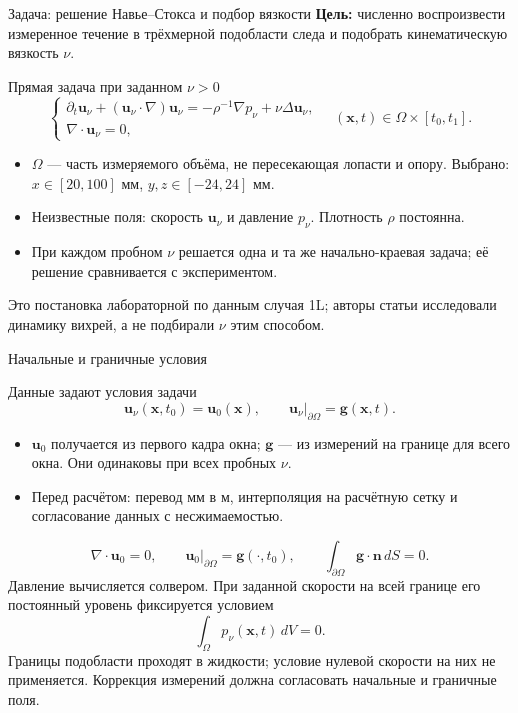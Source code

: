 \documentclass{beamer}
\newcommand{\U}{\mathbf{u}}
\begin{document}
\begin{frame}{Задача: решение Навье--Стокса и подбор вязкости}
\small
\textbf{Цель:} численно воспроизвести измеренное течение в трёхмерной
подобласти следа и подобрать кинематическую вязкость $\nu$.
\begin{block}{Прямая задача при заданном $\nu>0$}
\[
\begin{cases}
\partial_t\U_\nu+(\U_\nu\cdot\nabla)\U_\nu
=-\rho^{-1}\nabla p_\nu+\nu\Delta\U_\nu,\\[0.3em]
\nabla\cdot\U_\nu=0,
\end{cases}
\quad (\mathbf x,t)\in\Omega\times[t_0,t_1].
\]
\end{block}
\begin{itemize}
\item $\Omega$ --- часть измеряемого объёма, не пересекающая лопасти и опору.
Выбрано: $x\in[20,100]$ мм, $y,z\in[-24,24]$ мм.
\item Неизвестные поля: скорость $\U_\nu$ и давление $p_\nu$.
Плотность $\rho$ постоянна.
\item При каждом пробном $\nu$ решается одна и та же начально-краевая задача;
её решение сравнивается с экспериментом.
\end{itemize}
\footnotesize
Это постановка лабораторной по данным случая 1L;
авторы статьи исследовали динамику вихрей, а не подбирали $\nu$ этим способом.
\end{frame}

\begin{frame}{Начальные и граничные условия}
\small
\begin{block}{Данные задают условия задачи}
\[
\U_\nu(\mathbf x,t_0)=\U_0(\mathbf x),\qquad
\U_\nu|_{\partial\Omega}=\mathbf g(\mathbf x,t).
\]
\end{block}
\begin{itemize}
\item $\U_0$ получается из первого кадра окна;
$\mathbf g$ --- из измерений на границе для всего окна.
Они одинаковы при всех пробных $\nu$.
\item Перед расчётом: перевод мм в м, интерполяция на расчётную сетку
и согласование данных с несжимаемостью.
\end{itemize}
\[
\nabla\cdot\U_0=0,\qquad
\U_0|_{\partial\Omega}=\mathbf g(\cdot,t_0),\qquad
\int_{\partial\Omega}\mathbf g\cdot\mathbf n\,dS=0.
\]
Давление вычисляется солвером. При заданной скорости на всей границе
его постоянный уровень фиксируется условием
\[
\int_\Omega p_\nu(\mathbf x,t)\,dV=0.
\]
\footnotesize
Границы подобласти проходят в жидкости; условие нулевой скорости на них
не применяется. Коррекция измерений должна согласовать начальные и граничные поля.
\end{frame}
\end{document}
